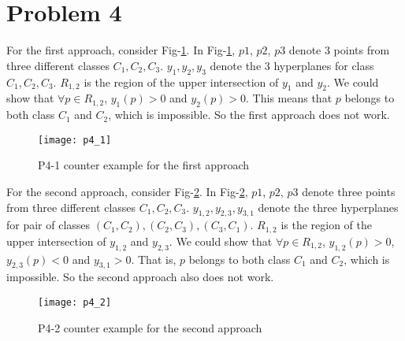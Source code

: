 \documentclass[12pt]{article}
\begin{document}
\section{Problem 4}

For the first approach, consider Fig-\ref{fig:p4_1}. In Fig-\ref{fig:p4_1}, $p1$, $p2$, $p3$ denote 3 points from three different classes $C_1, C_2, C_3$. $y_1, y_2, y_3$ denote the 3 hyperplanes for class $C_1, C_2, C_3$. $R_{1,2}$ is the region of the upper intersection of $y_1$ and $y_2$. We could show that $\forall p \in R_{1,2}$, $y_1(p) > 0$ and $y_2(p) > 0$. This means that $p$ belongs to both class $C_1$ and $C_2$, which is impossible. So the first approach does not work.

\begin{figure}[ht!]
  \centering
  \texttt{[image: p4\_1]}
  \caption{P4-1 counter example for the first approach \label{fig:p4_1}}
\end{figure}

For the second approach, consider Fig-\ref{fig:p4_2}. In Fig-\ref{fig:p4_2}, $p1$, $p2$, $p3$ denote three points from three different classes $C_1, C_2, C_3$. $y_{1,2}, y_{2,3}, y_{3,1}$ denote the three hyperplanes for pair of classes $(C_1, C_2), (C_2, C_3), (C_3,C_1)$. $R_{1,2}$ is the region of the upper intersection of $y_{1,2}$ and $y_{2,3}$. We could show that $\forall p \in R_{1,2}$, $y_{1,2}(p) > 0$, $y_{2,3}(p) < 0$ and $y_{3,1} > 0$. That is, $p$ belongs to both class $C_1$ and $C_2$, which is impossible. So the second approach also does not work.

\begin{figure}[ht!]
  \centering
  \texttt{[image: p4\_2]}
  \caption{P4-2 counter example for the second approach \label{fig:p4_2}}
\end{figure}
\end{document}
